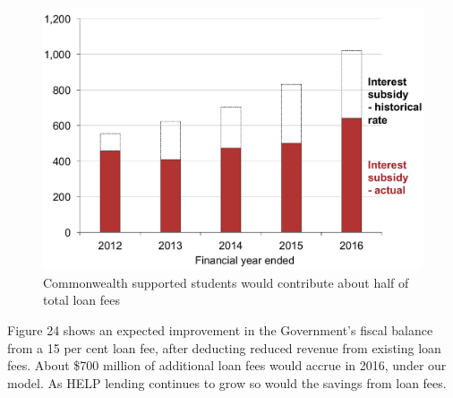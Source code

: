 \documentclass[embargoed]{grattan}
\begin{document}
\begin{figure}
\caption{Commonwealth supported students would contribute about half of total loan fees}\label{fig:fig23-Cth-supported-students-would-contr-half-tot-loan-fees}


\includegraphics[page=23]{atlas/Chartpack.pdf}

\end{figure}

Figure 24 shows an expected improvement in the Government's fiscal balance from a 15 per cent loan fee, after deducting reduced revenue from existing loan fees.
About \$700 million of additional loan fees would accrue in 2016, under our model.
As HELP lending continues to grow so would the savings from loan fees.
\end{document}
